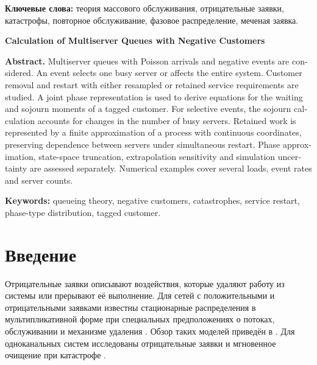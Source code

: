\begin{abstract}
Рассматриваются многоканальные системы массового обслуживания с пуассоновскими поступлениями и отрицательными воздействиями. Воздействие выбирает один занятый канал либо одновременно затрагивает всю систему. Исследуются удаление заявок и повторное обслуживание с новой или с первоначально выбранной длительностью. Для фазового обслуживания описано совместное состояние каналов и построены уравнения моментов ожидания и пребывания меченой заявки. Время пребывания при выборочных воздействиях рассчитывается с учётом изменения числа занятых каналов. Для сохранённой работы используется конечная аппроксимация процесса с непрерывными координатами; зависимость каналов при общих прерываниях сохраняется. Отдельно проверяются фазовая аппроксимация, усечение пространства состояний, экстраполяция и статистическая неопределённость имитации. Приведены результаты для нескольких нагрузок, интенсивностей воздействий и числа каналов.
\end{abstract}
\textbf{Ключевые слова:} теория массового обслуживания, отрицательные заявки, катастрофы, повторное обслуживание, фазовое распределение, меченая заявка.

\begin{otherlanguage}{english}
\bigskip
\begin{center}\textbf{Calculation of Multiserver Queues with Negative Customers}\end{center}
\textbf{Abstract.} Multiserver queues with Poisson arrivals and negative events are considered. An event selects one busy server or affects the entire system. Customer removal and restart with either resampled or retained service requirements are studied. A joint phase representation is used to derive equations for the waiting and sojourn moments of a tagged customer. For selective events, the sojourn calculation accounts for changes in the number of busy servers. Retained work is represented by a finite approximation of a process with continuous coordinates, preserving dependence between servers under simultaneous restart. Phase approximation, state-space truncation, extrapolation sensitivity and simulation uncertainty are assessed separately. Numerical examples cover several loads, event rates and server counts.

\textbf{Keywords:} queueing theory, negative customers, catastrophes, service restart, phase-type distribution, tagged customer.
\end{otherlanguage}

\section{Введение}
Отрицательные заявки описывают воздействия, которые удаляют работу из системы или прерывают её выполнение. Для сетей с положительными и отрицательными заявками известны стационарные распределения в мультипликативной форме при специальных предположениях о потоках, обслуживании и механизме удаления \cite{gelenbe1991,gelenbe1992}. Обзор таких моделей приведён в \cite{artalejo2000}. Для одноканальных систем исследованы отрицательные заявки \cite{harrison1996} и мгновенное очищение при катастрофе \cite{jain1996}.

